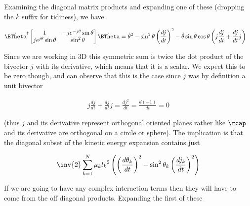 Examining the diagonal matrix products and expanding one of these (dropping the $k$ suffix for tidiness), we have

\begin{align}\label{eqn:sPolarMultiPendulum:moo1}
{\dot{\BTheta}}^\dagger
\begin{bmatrix}
1 & - j e^{-j \theta} \sin\theta \\
j e^{j \theta} \sin\theta & \sin^2\theta 
\end{bmatrix}
\dot{\BTheta} 
&=
\dot{\theta}^2 -\sin^2\theta \left(\frac{dj}{dt}\right)^2 - \dot{\theta} \sin\theta\cos\theta \left( j \frac{dj}{dt} + \frac{dj}{dt} j \right)
\end{align}

Since we are working in 3D this symmetric sum is twice the dot product of the bivector $j$ with its derivative, which means that it is a scalar.  We expect this to be zero though, and can observe that this is the case since $j$ was by definition a unit bivector

\begin{align}\label{eqn:sPolarMultiPendulum:moo2}
j \frac{dj}{dt} + \frac{dj}{dt} j = \frac{d j^2}{dt} = \frac{d (-1)}{dt} = 0
\end{align}

(thus $j$ and its derivative represent orthogonal oriented planes rather like $\rcap$ and its derivative are orthogonal on a circle or sphere).  The implication is that the diagonal subset of the kinetic energy expansion contains just

\begin{align}\label{eqn:sPolarMultiPendulum:moo3}
\inv{2}
\sum_{k=1}^N
\mu_k
{l_k}^2
\left(
\left(\frac{d\theta_k}{dt}\right)^2 -\sin^2\theta_k \left(\frac{d j_k}{dt}\right)^2  \right)
\end{align}

If we are going to have any complex interaction terms then they will have to come from the off diagonal products.  Expanding the first of these

